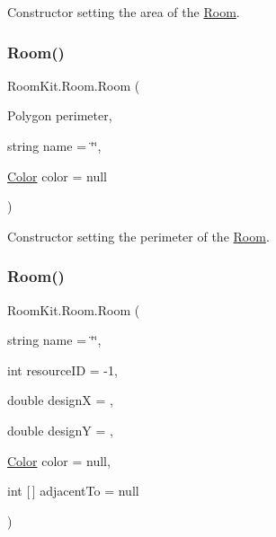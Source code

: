 Constructor setting the area of the \mbox{\hyperlink{class_room_kit_1_1_room}{Room}}. 

\mbox{\label{class_room_kit_1_1_room_a4ebb8022be4e847cf614df791da51539}} 
\subsubsection{\texorpdfstring{Room()}{Room()}\hspace{0.1cm}{\footnotesize\ttfamily [3/4]}}
{\footnotesize\ttfamily Room\+Kit.\+Room.\+Room (\begin{DoxyParamCaption}\item[{Polygon}]{perimeter,  }\item[{string}]{name = {\ttfamily \char`\"{}\char`\"{}},  }\item[{\mbox{\hyperlink{class_room_kit_1_1_room_ab988d7b6d772b68911acacc8da422052}{Color}}}]{color = {\ttfamily null} }\end{DoxyParamCaption})}



Constructor setting the perimeter of the \mbox{\hyperlink{class_room_kit_1_1_room}{Room}}. 

\mbox{\label{class_room_kit_1_1_room_a8556c2465decaeff214621c3e8606596}} 
\subsubsection{\texorpdfstring{Room()}{Room()}\hspace{0.1cm}{\footnotesize\ttfamily [4/4]}}
{\footnotesize\ttfamily Room\+Kit.\+Room.\+Room (\begin{DoxyParamCaption}\item[{string}]{name = {\ttfamily \char`\"{}\char`\"{}},  }\item[{int}]{resource\+ID = {\ttfamily -\/1},  }\item[{double}]{designX = {},  }\item[{double}]{designY = {},  }\item[{\mbox{\hyperlink{class_room_kit_1_1_room_ab988d7b6d772b68911acacc8da422052}{Color}}}]{color = {\ttfamily null},  }\item[{int \mbox{[}$\,$\mbox{]}}]{adjacent\+To = {\ttfamily null} }\end{DoxyParamCaption})}



